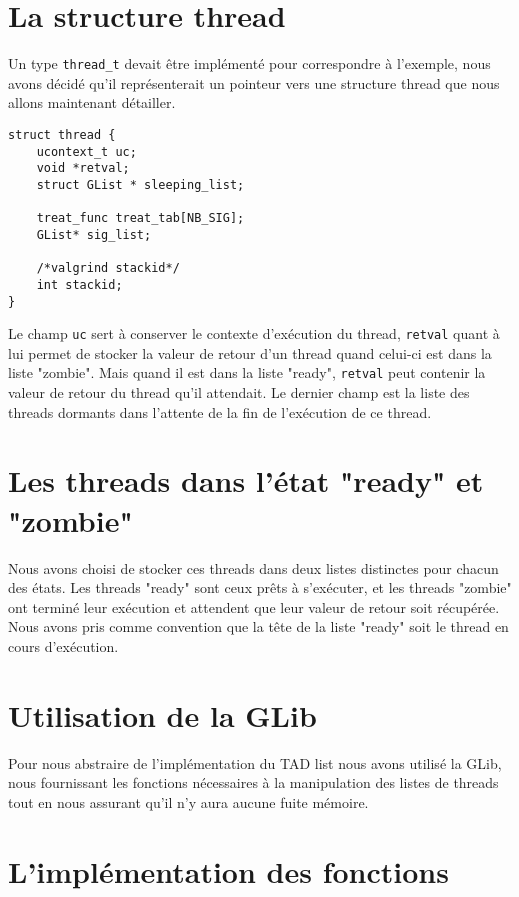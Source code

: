 \section {La structure thread}

Un type \verb'thread_t' devait être implémenté pour correspondre à
l'exemple, nous avons décidé qu'il représenterait un pointeur vers une
structure thread que nous allons maintenant détailler.\\

\begin{verbatim}
struct thread {
    ucontext_t uc;
    void *retval;
    struct GList * sleeping_list;

    treat_func treat_tab[NB_SIG];
    GList* sig_list;

    /*valgrind stackid*/
    int stackid;
}
\end{verbatim}
Le champ \verb'uc' sert à conserver le contexte d'exécution du thread,
\verb'retval' quant à lui permet de stocker la valeur de retour d'un
thread quand celui-ci est dans la liste "zombie". Mais quand il
est dans la liste "ready", \verb'retval' peut contenir la valeur de retour du
thread qu'il attendait. Le dernier champ est la liste des
threads dormants dans l'attente de la fin de l'exécution de ce thread.

\section {Les threads dans l'état "ready" et "zombie"}

Nous avons choisi de stocker ces threads dans deux listes distinctes
pour chacun des états. Les threads "ready" sont ceux prêts à
s'exécuter, et les threads "zombie" ont terminé leur exécution et
attendent que leur valeur de retour soit récupérée.\\ Nous avons pris
comme convention que la tête de la liste "ready" soit le thread en
cours d'exécution.

\section {Utilisation de la GLib}

Pour nous abstraire de l'implémentation du TAD list nous avons utilisé
la GLib, nous fournissant les fonctions nécessaires à la manipulation
des listes de threads tout en nous assurant qu'il n'y aura aucune
fuite mémoire.

\section {L'implémentation des fonctions}

